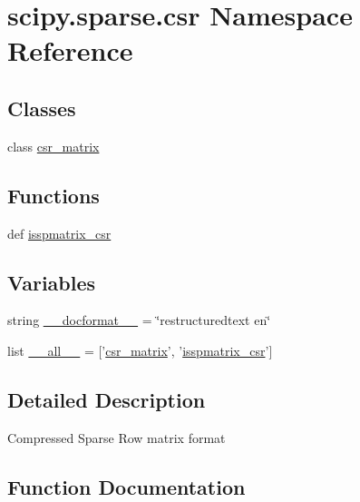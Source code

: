 \hypertarget{namespacescipy_1_1sparse_1_1csr}{}\section{scipy.\+sparse.\+csr Namespace Reference}
\label{namespacescipy_1_1sparse_1_1csr}
\subsection*{Classes}
\begin{DoxyCompactItemize}
\item 
class \hyperlink{classscipy_1_1sparse_1_1csr_1_1csr__matrix}{csr\+\_\+matrix}
\end{DoxyCompactItemize}
\subsection*{Functions}
\begin{DoxyCompactItemize}
\item 
def \hyperlink{namespacescipy_1_1sparse_1_1csr_af7af43f8a88854470fc856d3a9606355}{isspmatrix\+\_\+csr}
\end{DoxyCompactItemize}
\subsection*{Variables}
\begin{DoxyCompactItemize}
\item 
string \hyperlink{namespacescipy_1_1sparse_1_1csr_a942eec3cf4f365198b85c0a1854b24dc}{\+\_\+\+\_\+docformat\+\_\+\+\_\+} = \char`\"{}restructuredtext en\char`\"{}
\item 
list \hyperlink{namespacescipy_1_1sparse_1_1csr_a79c40a6878769908427a52dd6795dcc6}{\+\_\+\+\_\+all\+\_\+\+\_\+} = \mbox{[}'\hyperlink{classscipy_1_1sparse_1_1csr_1_1csr__matrix}{csr\+\_\+matrix}', '\hyperlink{namespacescipy_1_1sparse_1_1csr_af7af43f8a88854470fc856d3a9606355}{isspmatrix\+\_\+csr}'\mbox{]}
\end{DoxyCompactItemize}


\subsection{Detailed Description}
\begin{DoxyVerb}Compressed Sparse Row matrix format\end{DoxyVerb}
 

\subsection{Function Documentation}
\hypertarget{namespacescipy_1_1sparse_1_1csr_af7af43f8a88854470fc856d3a9606355}{}
